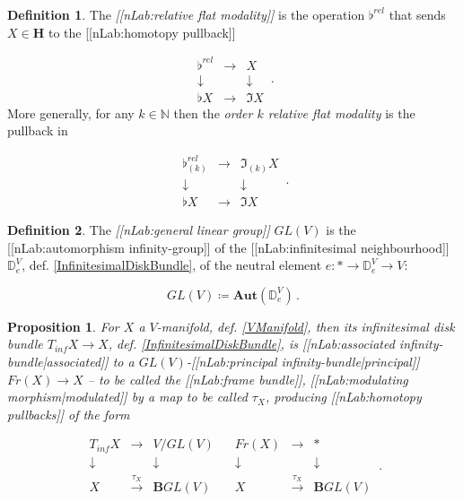 \documentclass[12pt,titlepage]{article}
\newcommand{\itexarray}[1]{\begin{matrix}#1\end{matrix}}
\theoremstyle{plain}
\newtheorem{prop}{Proposition}
\theoremstyle{definition}
\newtheorem{defn}{Definition}
\theoremstyle{remark}
\begin{document}
\begin{defn}
\label{RelativeFlat}\hypertarget{RelativeFlat}{}
The \emph{[[nLab:relative flat modality]]} is the operation $\flat^{rel}$ that sends $X \in \mathbf{H}$ to the [[nLab:homotopy pullback]]

\begin{displaymath}
\itexarray{
    \flat^{rel} &\longrightarrow& X
    \\
    \downarrow && \downarrow
    \\
    \flat X &\longrightarrow& \Im X
  }
  \,.
\end{displaymath}
More generally, for any $k \in \mathbb{N}$ then the \emph{order $k$ relative flat modality} is the pullback in

\begin{displaymath}
\itexarray{
    \flat^{rel}_{(k)} &\longrightarrow& \Im_{(k)} X
    \\
    \downarrow && \downarrow
    \\
    \flat X &\longrightarrow& \Im X
  }
  \,.
\end{displaymath}
\end{defn}
\begin{defn}
\label{GeneralLinearGroup}\hypertarget{GeneralLinearGroup}{}
The \emph{[[nLab:general linear group]]} $GL(V)$ is the [[nLab:automorphism infinity-group]] of the [[nLab:infinitesimal neighbourhood]] $\mathbb{D}^V_e$, def. \ref{InfinitesimalDiskBundle}, of the neutral element $e \colon \ast \to \mathbb{D}^V_e \to V$:

\begin{displaymath}
GL(V) \coloneqq \mathbf{Aut}(\mathbb{D}^V_e)
  \,.
\end{displaymath}
\end{defn}
\begin{prop}
\label{FrameBundle}\hypertarget{FrameBundle}{}
For $X$ a $V$-manifold, def. \ref{VManifold}, then its infinitesimal disk bundle $T_{inf} X \to X$, def. \ref{InfinitesimalDiskBundle}, is [[nLab:associated infinity-bundle|associated]] to a $GL(V)$-[[nLab:principal infinity-bundle|principal]] $Fr(X) \to X$ -- to be called the \emph{[[nLab:frame bundle]]}, [[nLab:modulating morphism|modulated]] by a map to be called $\tau_X$, producing [[nLab:homotopy pullbacks]] of the form

\begin{displaymath}
\itexarray{
     T_{inf} X &\longrightarrow& V/GL(V)
     \\
     \downarrow && \downarrow
     \\
     X &\stackrel{\tau_X}{\longrightarrow}& \mathbf{B} GL(V)
  }
  \;\;\;
  \itexarray{
     Fr(X) &\longrightarrow& \ast
     \\
     \downarrow && \downarrow
     \\
     X &\stackrel{\tau_X}{\longrightarrow}& \mathbf{B} GL(V)
  }
  \,.
\end{displaymath}
\end{prop}
\end{document}
